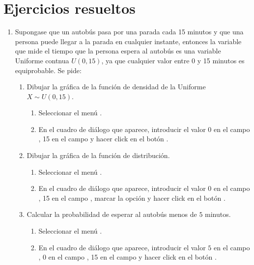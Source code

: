 \section{Ejercicios resueltos}
\begin{enumerate}[leftmargin=*]
\item Supongase que un autobús pasa por una parada cada 15 minutos y que una persona puede llegar a la parada en
cualquier instante, entonces la variable que mide el tiempo que la persona espera al autobús es una variable Uniforme
contnua $U(0,15)$, ya que cualquier valor entre 0 y 15 minutos es equiprobable.
Se pide:
\begin{enumerate}
\item Dibujar la gráfica de la función de densidad de la Uniforme $X\sim U(0,15)$. 
\begin{indicacion}
\begin{enumerate}
\item Seleccionar el menú .
\item En el cuadro de diálogo que aparece, introducir el valor 0 en el campo , 15 en el campo
 y hacer click en el botón .
\end{enumerate}
\end{indicacion}

\item Dibujar la gráfica de la función de distribución. 
\begin{indicacion}
\begin{enumerate}
\item Seleccionar el menú .
\item En el cuadro de diálogo que aparece, introducir el valor 0 en el campo , 15 en el campo
, marcar la opción  y hacer click en el botón .
\end{enumerate}
\end{indicacion}

\item Calcular la probabilidad de esperar al autobús menos de $5$ minutos.
\begin{indicacion}
\begin{enumerate}
\item Seleccionar el menú .
\item En el cuadro de diálogo que aparece, introducir el valor $5$ en el campo , 0 en
el campo , 15 en el campo  y hacer click en el botón .
\end{enumerate}
\end{indicacion}


\end{enumerate}
\end{enumerate}
